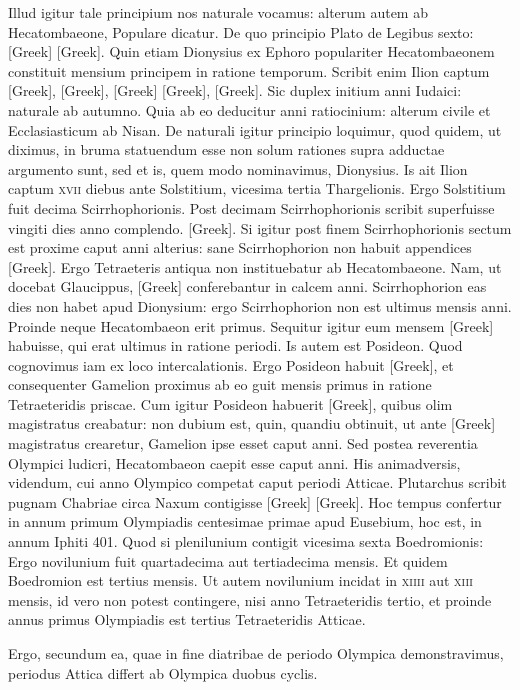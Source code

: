 Illud igitur tale principium nos naturale vocamus:
alterum autem ab Hecatombaeone, Populare dicatur.
De quo
principio Plato de Legibus sexto: \textgreek{[Greek]}
\textgreek{[Greek]}.
Quin etiam Dionysius ex Ephoro
populariter Hecatombaeonem constituit mensium principem in ratione
temporum.
Scribit enim Ilion captum \textgreek{[Greek]},
\textgreek{[Greek]}, \textgreek{[Greek]}
\textgreek{[Greek]}, \textgreek{[Greek]}.
Sic duplex initium anni
Iudaici: naturale ab autumno.
Quia ab eo deducitur anni ratiocinium:
alterum civile et Ecclasiasticum ab Nisan.
De naturali igitur
principio loquimur, quod quidem, ut diximus, in bruma statuendum
esse non solum rationes supra adductae argumento sunt, sed et is, quem
modo nominavimus, Dionysius.
Is ait Ilion captum \textsc{xvii} diebus
ante Solstitium, vicesima tertia Thargelionis.
Ergo Solstitium fuit
decima Scirrhophorionis.
Post decimam Scirrhophorionis scribit superfuisse
vingiti dies anno complendo.
\textgreek{[Greek]}.
Si igitur post finem
Scirrhophorionis sectum est proxime caput anni alterius: sane Scirrhophorion
non habuit appendices \textgreek{[Greek]}.
Ergo Tetraeteris
antiqua non instituebatur ab Hecatombaeone.
Nam, ut docebat
Glaucippus, \textgreek{[Greek]} conferebantur in calcem anni.
Scirrhophorion
eas dies non habet apud Dionysium: ergo Scirrhophorion
non est ultimus mensis anni.
Proinde neque Hecatombaeon erit primus.
Sequitur igitur eum mensem \textgreek{[Greek]} habuisse, qui
erat ultimus in ratione periodi.
Is autem est Posideon.
Quod cognovimus
iam ex loco intercalationis.
Ergo Posideon habuit \textgreek{[Greek]}, et
consequenter Gamelion proximus ab eo guit mensis primus in ratione
Tetraeteridis priscae.
Cum igitur Posideon habuerit \textgreek{[Greek]},
quibus olim magistratus creabatur: non dubium est, quin, quandiu
obtinuit, ut ante \textgreek{[Greek]} magistratus crearetur,
Gamelion ipse esset caput anni.
Sed postea reverentia Olympici ludicri,
Hecatombaeon caepit esse caput anni.
His animadversis, videndum,
cui anno Olympico competat caput periodi Atticae.
Plutarchus scribit
pugnam Chabriae circa Naxum contigisse \textgreek{[Greek]}
\textgreek{[Greek]}.
Hoc tempus confertur in annum primum
Olympiadis centesimae primae apud Eusebium, hoc est, in annum
Iphiti 401.
Quod si plenilunium contigit vicesima sexta Boedromionis:
Ergo novilunium fuit quartadecima aut tertiadecima mensis.
Et quidem Boedromion est tertius mensis.
Ut autem novilunium incidat in
\textsc{xiiii} aut \textsc{xiii} mensis, id vero non potest contingere,
 nisi anno Tetraeteridis
tertio, et proinde annus primus Olympiadis est tertius Tetraeteridis
Atticae.

Ergo, secundum ea, quae in fine diatribae de periodo
Olympica demonstravimus, periodus Attica differt ab Olympica
duobus cyclis.
























